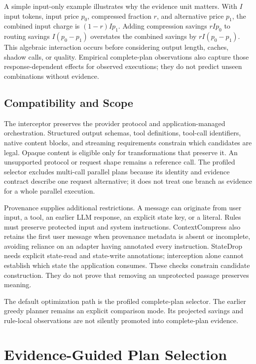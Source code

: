 A simple input-only example illustrates why the evidence unit matters. With $I$
input tokens, input price $p_0$, compressed fraction $r$, and alternative price $p_1$,
the combined input charge is $(1-r)Ip_1$. Adding compression savings $rIp_0$ to
routing savings $I(p_0-p_1)$ overstates the combined savings by $rI(p_0-p_1)$.
This algebraic interaction occurs before considering output length, caches,
shadow calls, or quality. Empirical complete-plan observations also capture those
response-dependent effects for observed executions; they do not predict unseen
combinations without evidence.

\subsection{Compatibility and Scope}

The interceptor preserves the provider protocol and application-managed orchestration.
Structured output schemas, tool definitions, tool-call identifiers, native content
blocks, and streaming requirements constrain which candidates are legal. Opaque
content is eligible only for transformations that preserve it. An unsupported
protocol or request shape remains a reference call. The profiled selector excludes
multi-call parallel plans because its identity and evidence contract describe one
request alternative; it does not treat one branch as evidence for a whole parallel
execution.

Provenance supplies additional restrictions. A message can originate from user
input, a tool, an earlier LLM response, an explicit state key, or a literal. Rules
must preserve protected input and system instructions. ContextCompress also retains
the first user message when provenance metadata is absent or incomplete, avoiding
reliance on an adapter having annotated every instruction. StateDrop needs explicit
state-read and state-write annotations; interception alone cannot establish which
state the application consumes. These checks constrain candidate construction.
They do not prove that removing an unprotected passage preserves meaning.

The default optimization path is the profiled complete-plan selector. The earlier
greedy planner remains an explicit comparison mode. Its projected savings and
rule-local observations are not silently promoted into complete-plan evidence.

\section{Evidence-Guided Plan Selection}
\label{sec:design}

